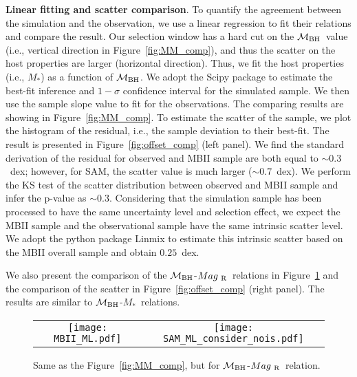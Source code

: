 \documentclass{natureprintstyle}
\newcommand{\mbh}{$\mathcal M_{\rm BH}$}
\newcommand{\mr}{$Mag_{\rm ~R}$}
\newcommand{\mstar}{{$M_*$}}
\begin{document}

\textbf{Linear fitting and scatter comparison}.  
To quantify the agreement between the simulation and the observation, we use a linear regression to fit their relations and compare the result. Our selection window has a hard cut on the \mbh\ value (i.e., vertical direction in Figure~\ref{fig:MM_comp}), and thus the scatter on the host properties are larger (horizontal direction). Thus, we fit the host properties (i.e., \mstar) as a function of \mbh. We adopt the {\sc Scipy} package to estimate the best-fit inference and $1-\sigma$ confidence interval for the simulated sample. We then use the sample slope value to fit for the observations. The comparing results are showing in Figure~\ref{fig:MM_comp}. To estimate the scatter of the sample, we plot the histogram of the residual, i.e., the sample deviation to their best-fit. The result is presented in Figure~\ref{fig:offset_comp} (left panel). We find the standard derivation of the residual for observed and MBII sample are both equal to $\sim0.3$~dex; however, for SAM, the scatter value is much larger ($\sim0.7$~dex).  We perform the KS test of the scatter distribution between observed and MBII sample and infer the p-value as $\sim0.3$. Considering that the simulation sample has been processed to have the same uncertainty level and selection effect, we expect the MBII sample and the observational sample have the same intrinsic scatter level. We adopt the python package {\sc Linmix} to estimate this intrinsic scatter based on the MBII overall sample and obtain $0.25$~dex.

We also present the comparison of the \mbh-\mr\ relations in Figure~\ref{fig:ML_comp} and the comparison of the scatter in Figure~\ref{fig:offset_comp} (right panel). The results are similar to \mbh-\mstar\ relations.

\begin{figure*}[t]%
\begin{tabular}{c c}
\texttt{[image: MBII\_ML.pdf]} &
\texttt{[image: SAM\_ML\_consider\_nois.pdf]} \\
\end{tabular}
\caption{Same as the Figure~\ref{fig:MM_comp}, but for \mbh-\mr\ relation.}
\label{fig:ML_comp}
\end{figure*}
\end{document}
